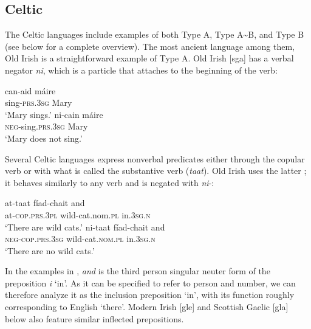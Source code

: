 \documentclass[output=paper,colorlinks,citecolor=brown]{langscibook}
\begin{document}
\subsection{Celtic}\label{sec:ieur-4.6}

The Celtic languages include examples of both Type A, Type
A{\textasciitilde}B, and Type B (see  below
for a complete overview). The most ancient language among them, Old
Irish is a straightforward example of Type A. Old Irish [sga] has a verbal negator \textit{ni}, which is a particle that attaches to the beginning of the verb: 
%
\begin{exe}\ex\label{ex:ieur-oldirish-sing}
\begin{xlist}
\ex\gll can-aid máire \\
sing-\textsc{prs.3sg} Mary \\
    \glt `Mary sings.'
\ex\gll ni-cain máire\\
\textsc{neg}-sing.\textsc{prs.3sg} Mary\\
\glt `Mary does not sing.'
\end{xlist}\end{exe}
%
Several Celtic languages express nonverbal predicates either through the
copular verb or with what is called the substantive verb (\textit{taat}). Old Irish uses
the latter \parencite[39ff]{McCone2005}; it behaves similarly to any verb and is negated with \textit{ni}-:
%
\begin{exe}\ex\label{ex:ieur-oldirish-wildcats}
\begin{xlist}
\ex\gll at-taat fíad-chait and \\
at-\textsc{cop}.\textsc{prs}.\textsc{3pl}    wild-cat.nom.\textsc{pl} in.\textsc{3sg.n} \\
    \glt `There are wild cats.'
\ex\gll ni-taat fíad-chait and\\
\textsc{neg}-\textsc{cop}.\textsc{prs}.\textsc{3sg}
wild-cat.\textsc{nom}.\textsc{pl} in.\textsc{3sg.n}\\
\glt `There are no wild cats.'
\end{xlist}\end{exe}
%
In the examples in , \textit{and} is the
third person singular neuter form of the preposition \textit{i} `in'. As it
can be specified to refer to person and number, we can therefore analyze it
as the inclusion preposition `in', with its function roughly corresponding
to English `there'. Modern Irish [gle] and Scottish
Gaelic [gla] below also feature similar inflected prepositions.
\end{document}

